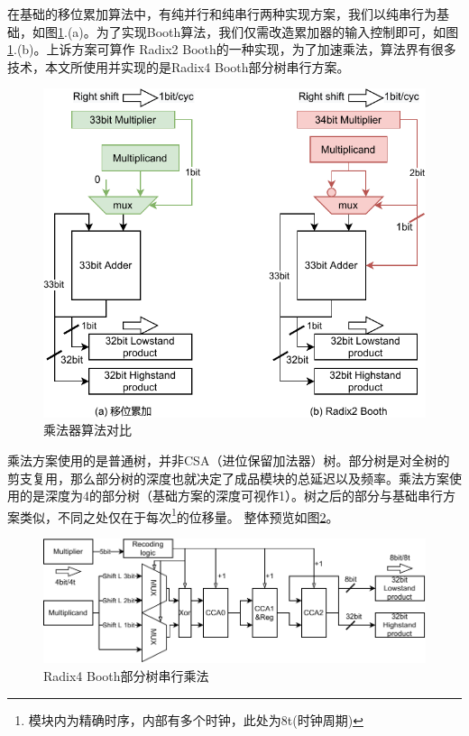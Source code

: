 \documentclass[UTF8,12pt,punct=kaiming,fontset=none]{ctexart}
\begin{document}
在基础的移位累加算法中，有纯并行和纯串行两种实现方案，我们以纯串行为基础，如图\ref{fig2}.(a)。为了实现Booth算法，我们仅需改造累加器的输入控制即可，如图\ref{fig2}.(b)。上诉方案可算作 Radix2 Booth的一种实现，为了加速乘法，算法\cite{parhami2010computer}界有很多技术，本文所使用并实现的是Radix4 Booth部分树串行方案。
\newline
\begin{figure}[H]
    \centering
    \includegraphics[scale=1]{mul.pdf}
    \caption{乘法器算法对比}
    \label{fig2}
\end{figure}

乘法方案使用的是普通树，并非CSA（进位保留加法器）树。部分树是对全树的剪支复用，那么部分树的深度也就决定了成品模块的总延迟以及频率。乘法方案使用的是深度为4的部分树（基础方案的深度可视作1）。树之后的部分与基础串行方案类似，不同之处仅在于每次\footnote{模块内为精确时序，内部有多个时钟，此处为8t(时钟周期)}的位移量。
整体预览如图\ref{fig3}。
\begin{figure}[H]
    \centering
    \includegraphics[scale=1]{hmul.pdf}
    \caption{Radix4 Booth部分树串行乘法}
    \label{fig3}
\end{figure}
\newpage
\end{document}
